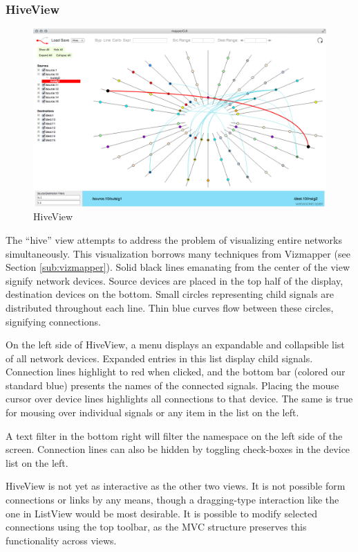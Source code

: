 	\subsubsection{HiveView}

\begin{figure}[ht]
\centering
	\includegraphics[width=\textwidth]{figures/hive}
\caption{HiveView}
\label{fig:hive}
\end{figure}
	
The ``hive'' view attempts to address the problem of visualizing entire networks simultaneously. This visualization borrows many techniques from Vizmapper (see Section \ref{sub:vizmapper}). Solid black lines emanating from the center of the view signify network devices. Source devices are placed in the top half of the display, destination devices on the bottom. Small circles representing child signals are distributed throughout each line. Thin blue curves flow between these circles, signifying connections. 

On the left side of HiveView, a menu displays an expandable and collapsible list of all network devices. Expanded entries in this list display child signals. Connection lines highlight to red when clicked, and the bottom bar (colored our standard blue) presents the names of the connected signals. Placing the mouse cursor over device lines highlights all connections to that device. The same is true for mousing over individual signals or any item in the list on the left.

A text filter in the bottom right will filter the namespace on the left side of the screen. Connection lines can also be hidden by toggling check-boxes in the device list on the left.

HiveView is not yet as interactive as the other two views. It is not possible form connections or links by any means, though a dragging-type interaction like the one in ListView would be most desirable. It is possible to modify selected connections using the top toolbar, as the MVC structure preserves this functionality across views.

